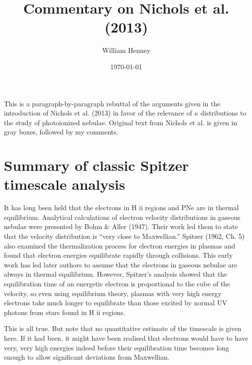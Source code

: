 \documentclass[11pt]{article}
\author{William Henney}
\date{\today}
\title{Commentary on Nichols et al. (2013)}
\renewenvironment{quote}{\begin{shaded*}\small\sffamily}{\end{shaded*}}
\begin{document}
\maketitle
This is a paragraph-by-paragraph rebuttal of the arguments given in the introduction of Nichols et al. (2013) in favor of the relevance of \(\kappa\) distributions to the study of photoionized nebulae.  Original text from Nichols et al. is given in gray boxes, followed by my comments. 

\section*{Summary of classic Spitzer timescale analysis}
\label{sec:orgheadline1}
\begin{quote}
It has long been held that the electrons in H ii regions and PNe are in thermal equilibrium. Analytical calculations of electron velocity distributions in gaseous nebulae were presented by Bohm \& Aller (1947). Their work led them to state that the velocity distribution is “very close to Maxwellian.” Spitzer (1962, Ch. 5) also examined the thermalization process for electron energies in plasmas and found that electron energies equilibrate rapidly through collisions. This early work has led later authors to assume that the electrons in gaseous nebulae are always in thermal equilibrium. However, Spitzer’s analysis showed that the equilibration time of an energetic electron is proportional to the cube of the velocity, so even using equilibrium theory, plasmas with very high energy electrons take much longer to equilibrate than those excited by normal UV photons from stars found in H ii regions.
\end{quote}

This is all true.  But note that no quantitative estimate of the timescale is given here.  If it had been, it might have been realised that electrons would have to have very, very high energies indeed before their equilibration time becomes long enough to allow significant deviations from Maxwellian.  
\end{document}
